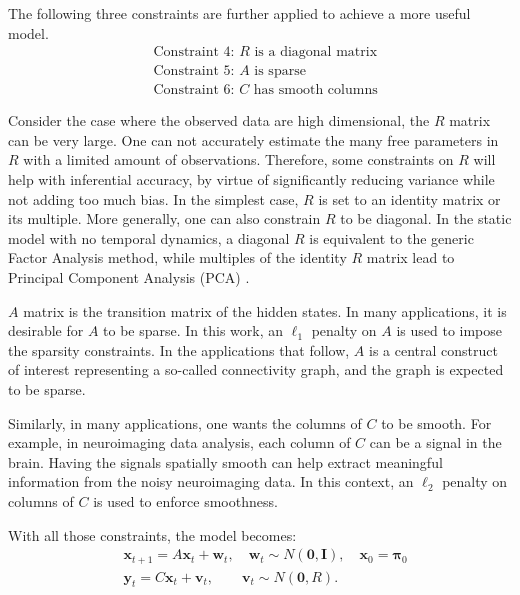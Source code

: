 \documentclass[fleqn,12pt]{article}
\providecommand{\mb}[1]{\boldsymbol{#1}}
\newcommand{\bx}{\mb{x}}
\newcommand{\by}{\mb{y}}
\begin{document}
The following three constraints are further applied to achieve a more useful model.
\vspace*{-3mm}
\begin{equation*}\label{eqn:constraints2}
\begin{aligned}
&\text{Constraint 4: }R\text{ is a diagonal matrix}\\
&\text{Constraint 5: }A\text{ is sparse}\\
&\text{Constraint 6: }C\text{ has smooth columns}
\end{aligned}
\end{equation*}

Consider the case where the observed data are high dimensional, the $R$ matrix can be very large. One can not accurately estimate the many free parameters in $R$ with a limited amount of observations. Therefore, some constraints on $R$ will help with inferential accuracy, by virtue of significantly reducing variance while not adding too much bias. In the simplest case, $R$ is set to an identity matrix or its multiple. More generally, one can also constrain $R$ to be diagonal. In the static model with no temporal dynamics, a diagonal $R$ is equivalent to the generic Factor Analysis method, while multiples of the identity $R$ matrix lead to Principal Component Analysis (PCA) \citep{roweis1999unifying}.

$A$ matrix is the transition matrix of the hidden states. In many applications, it is desirable for $A$ to be sparse. In this work, an $\ell_1$ penalty on $A$ is used to impose the sparsity constraints. In the applications that follow, $A$ is a central construct of interest representing a so-called connectivity graph, and the graph is expected to be sparse.

Similarly, in many applications, one wants the columns of $C$ to be smooth. For example, in neuroimaging data analysis, each column of $C$ can be a signal in the brain. Having the signals spatially smooth can help extract meaningful information from the noisy neuroimaging data. In this context, an $\ell_2$ penalty on columns of $C$ is used to enforce smoothness.

With all those constraints, the model becomes:
\begin{equation}\label{eq:model0}
\begin{aligned}
	&\bx_{t+1}=A\bx_{t}+\mathbf{w}_t, \quad \mathbf{w}_t\sim N(\mathbf{0},\mathbf{I}),\quad \bx_0 = \mathbf{\pi}_0\\
	&\by_t=C\bx_t+\mathbf{v}_t,\qquad \mathbf{v}_t\sim N(\mathbf{0},R).
\end{aligned}
\end{equation}
\end{document}

